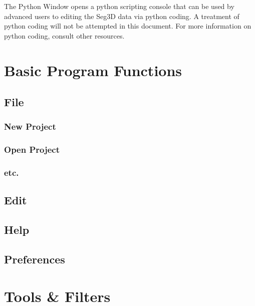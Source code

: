 \documentclass[fleqn,11pt,openany]{book}
\begin{document}
The Python Window opens a python scripting console that can be used by advanced users to editing the Seg3D data via python coding.  
A treatment of python coding will not be attempted in this document.
For more information on python coding, consult other resources.

\chapter{Basic Program Functions}

\begin{introduction}

\end{introduction}

\section{File}

\subsection{New Project}

\subsection{Open Project}

\subsection{etc.}

\section{Edit}

\section{Help}

\section{Preferences}

\chapter{Tools \& Filters}

\begin{introduction}

\end{introduction}
\end{document}
